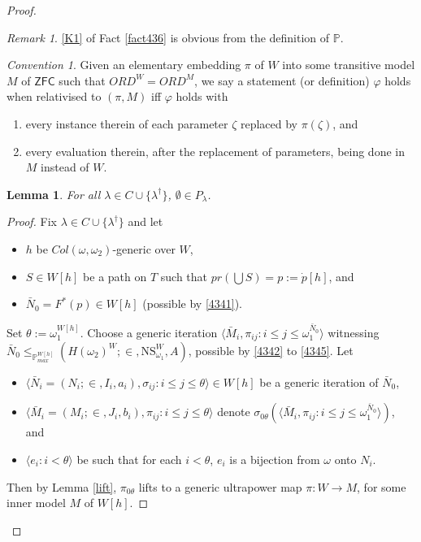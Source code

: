 \documentclass[12pt, twoside]{memoir}
\numberwithin{equation}{section}
\newtheorem{lem}[thm]{Lemma}
\theoremstyle{definition}
\theoremstyle{remark}
\newtheorem{rem}[thm]{Remark}
\newtheorem{con}[thm]{Convention}
\theoremstyle{definition}
\theoremstyle{definition}
\theoremstyle{definition}
\theoremstyle{remark}
\begin{document}
\begin{proof}
\begin{rem}\label{rem447}
\ref{K1} of Fact \ref{fact436} is obvious from the definition of $\mathbb{P}$.
\end{rem}

\begin{con}
Given an elementary embedding $\pi$ of $W$ into some transitive model $M$ of $\mathsf{ZFC}$ such that $ORD^W = ORD^M$, we say a statement (or definition) $\varphi$ holds when relativised to $(\pi, M)$ iff $\varphi$ holds with
\begin{enumerate}[label=(\alph*)]
    \item every instance therein of each parameter $\zeta$ replaced by $\pi(\zeta)$, and
    \item every evaluation therein, after the replacement of parameters, being done in $M$ instead of $W$.
\end{enumerate}
\end{con}

\begin{lem}\label{nonemp2}
For all $\lambda \in C \cup \{\lambda^{\dagger}\}$, $\emptyset \in P_{\lambda}$.
\end{lem}

\begin{proof}
Fix $\lambda \in C \cup \{\lambda^{\dagger}\}$ and let 
\begin{itemize}
    \item $h$ be $Col(\omega, \omega_2)$-generic over $W$,
    \item $S \in W[h]$ be a path on $T$ such that $pr(\bigcup S) = p := \dot{p}[h]$, and
    \item $\bar{N}_0 = F^*(p) \in W[h]$ (possible by \ref{4341}).
\end{itemize}
Set $\theta := \omega_1^{W[h]}$. Choose a generic iteration $\langle \bar{M}_i, \pi_{ij} : i \leq j \leq \omega_1^{\bar{N}_0} \rangle$ witnessing $\bar{N}_0 \leq_{\mathbb{P}^{W[h]}_{max}} (H(\omega_2)^W; \in, \mathrm{NS}_{\omega_1}^W, A)$, possible by \ref{4342} to \ref{4345}. Let 
\begin{itemize}
    \item $\langle \bar{N}_i = (N_i; \in, I_i, a_i), \sigma_{ij} : i \leq j \leq \theta \rangle \in W[h]$ be a generic iteration of $\bar{N}_0$,
    \item $\langle \bar{M}_i = (M_i; \in, J_i, b_i), \pi_{ij} : i \leq j \leq \theta \rangle$ denote $\sigma_{0\theta}(\langle \bar{M}_i, \pi_{ij} : i \leq j \leq \omega_1^{\bar{N}_0} \rangle)$, and
    \item $\langle e_i : i < \theta \rangle$ be such that for each $i < \theta$, $e_i$ is a bijection from $\omega$ onto $N_i$.
\end{itemize}
Then by Lemma \ref{lift}, $\pi_{0\theta}$ lifts to a generic ultrapower map $\pi : W \longrightarrow M$, for some inner model $M$ of $W[h]$. 


\end{proof}
\end{proof}
\end{document}
